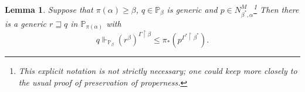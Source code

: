 \documentclass[a4paper, 11pt]{amsart}
\newtheorem{lemma}[lemma]{Lemma}
\theoremstyle{remark}
\newcommand{\PP}{\mathbb{P}}
\begin{document}
\begin{lemma} 
Suppose that $\pi(\alpha)\geq\beta$, $q\in \PP_\beta$ is generic and $p\in N_{\beta^*,\alpha}^M$\footnote{This explicit notation is not strictly necessary; one could keep more closely to the usual proof of preservation of properness.} 
Then 
there is a generic $r\sqsupseteq q$ in $\PP_{\pi(\alpha)}$ with 
$$q \Vdash_{\PP_\beta} (r^\beta)^{\Gamma{\upharpoonright}\beta} \leq \pi_*(p^{\Gamma^*{\upharpoonright}\beta^*}).$$ 

\end{lemma} 
\end{document}
